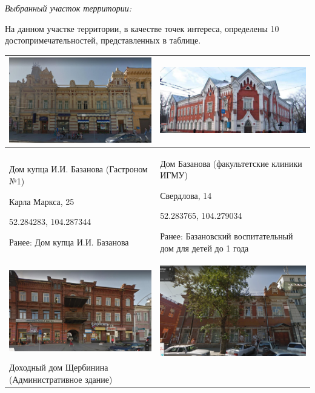 \solutionSection

\textit{Выбранный участок территории:}


На данном участке территории, в качестве точек интереса, определены 10 достопримечательностей, представленных в таблице.

\begin{longtable}{|p{8cm}|p{8cm}|}
    \hline
    \includegraphics[width=6.5cm]{2} & \includegraphics[width=8cm]{3} \\
    \hline
    Дом купца И.И. Базанова  (Гастроном №1)

    Карла Маркса, 25 
    
    52.284283, 104.287344
    
    Ранее: Дом купца И.И. Базанова & Дом Базанова (факультетские клиники ИГМУ) 

    Свердлова, 14 

    52.283765, 104.279034

    Ранее: Базановский воспитательный дом для детей до 1 года \\
    \hline
    \includegraphics[width=7cm]{4} & \includegraphics[width=6.5cm]{5} \\
    \hline
    Доходный дом Щербинина (Административное здание)


\end{longtable}

